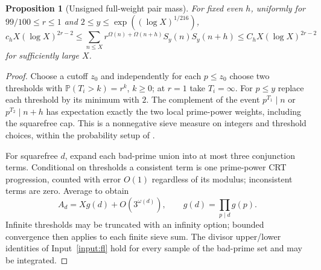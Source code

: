 \documentclass[11pt]{article}
\newtheorem{proposition}[theorem]{Proposition}
\theoremstyle{definition}
\newcommand{\Prob}{\mathbb P}
\theoremstyle{remark}
\numberwithin{equation}{section}
\begin{document}
\begin{proposition}[Unsigned full-weight pair mass]\label{prop:full-mass}
For fixed even $h$, uniformly for $99/100\le r\le1$ and
$2\le y\le\exp((\log X)^{1/216})$,
\begin{equation}\label{eq:full-pair-mass}
 c_hX(\log X)^{2r-2}\le\sum_{n\le X}r^{\Omega(n)+\Omega(n+h)}S_y(n)S_y(n+h)
 \le C_hX(\log X)^{2r-2}
\end{equation}
for sufficiently large $X$.
\end{proposition}
\begin{proof}
Choose a cutoff $z_0$ and independently for each $p\le z_0$ choose two thresholds with
$\Prob(T_i>k)=r^k$, $k\ge0$; at $r=1$ take $T_i=\infty$.
For $p\le y$ replace each threshold by its minimum with $2$.
The complement of the event $p^{T_1}\mid n$ or $p^{T_2}\mid n+h$ has expectation exactly the two local
prime-power weights, including the squarefree cap. This is a nonnegative sieve measure on integers and
threshold choices, within the probability setup of \cite[pp.~1--3]{Ford}.

For squarefree $d$, expand each bad-prime union into at most three conjunction terms.
Conditional on thresholds a consistent term is one prime-power CRT progression, counted with error $O(1)$
regardless of its modulus; inconsistent terms are zero. Average to obtain
\begin{equation}\label{eq:threshold-crt}
 A_d=Xg(d)+O(3^{\omega(d)}),\qquad g(d)=\prod_{p\mid d}g(p).
\end{equation}
Infinite thresholds may be truncated with an infinity option; bounded convergence then applies to each finite
sieve sum. The divisor upper/lower identities of Input~\ref{input:fl} hold for every sample of the bad-prime
set and may be integrated.


\end{proof}
\end{document}
